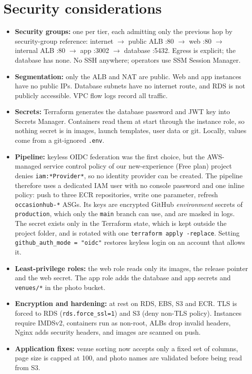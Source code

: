 \documentclass[10pt,a4paper]{article}
\begin{document}
\section{Security considerations}\label{sec:sec}
\begin{itemize}
  \item \textbf{Security groups:} one per tier, each admitting only the previous
  hop by security-group reference: internet $\rightarrow$ public ALB :80
  $\rightarrow$ web :80 $\rightarrow$ internal ALB :80 $\rightarrow$ app :3002
  $\rightarrow$ database :5432. Egress is explicit; the database has none. No
  SSH anywhere; operators use SSM Session Manager.
  \item \textbf{Segmentation:} only the ALB and NAT are public. Web and app
  instances have no public IPs. Database subnets have no internet route, and RDS
  is not publicly accessible. VPC flow logs record all traffic.
  \item \textbf{Secrets:} Terraform generates the database password and JWT key
  into Secrets Manager. Containers read them at start through the instance role,
  so nothing secret is in images, launch templates, user data or git. Locally,
  values come from a git-ignored \texttt{.env}.
  \item \textbf{Pipeline:} keyless OIDC federation was the first choice, but
  the AWS-managed service control policy of our new-experience (Free plan)
  project denies \texttt{iam:*Provider*}, so no identity provider can be
  created. The pipeline therefore uses a dedicated IAM user with no console
  password and one inline policy: push to three ECR repositories, write one
  parameter, refresh \texttt{occasionhub-*} ASGs. Its keys are encrypted GitHub
  \emph{environment} secrets of \texttt{production}, which only the
  \texttt{main} branch can use, and are masked in logs. The secret exists only in
  the Terraform state, which is kept outside the project folder, and is rotated
  with one \texttt{terraform apply -replace}. Setting \texttt{github\_auth\_mode = "oidc"}
  restores keyless login on an account that allows it.
  \item \textbf{Least-privilege roles:} the web role reads only its images, the
  release pointer and the web secret. The app role adds the database and app
  secrets and \texttt{venues/*} in the photo bucket.
  \item \textbf{Encryption and hardening:} at rest on RDS, EBS, S3 and ECR. TLS
  is forced to RDS (\texttt{rds.force\_ssl=1}) and S3 (deny non-TLS policy).
  Instances require IMDSv2, containers run as non-root, ALBs drop invalid
  headers, Nginx adds security headers, and images are scanned on push.
  \item \textbf{Application fixes:} venue sorting now accepts only a fixed set
  of columns, page size is capped at 100, and photo names are validated before
  being read from S3.
\end{itemize}
\end{document}
